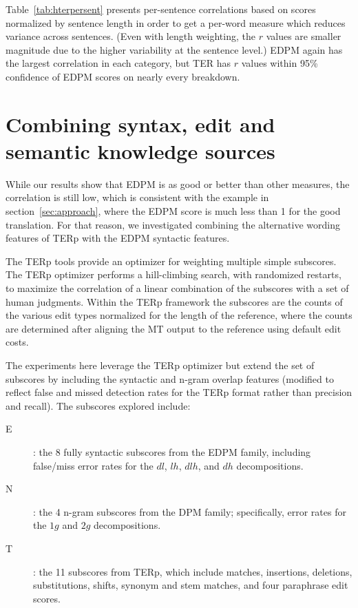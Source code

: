 \documentclass{kluwer}    %
\begin{document}
\begin{article}
Table~\ref{tab:hterpersent} presents per-sentence correlations based on
scores normalized by sentence length in order to get a per-word measure which
reduces variance across sentences.  (Even with length weighting, the
$r$ values are smaller magnitude due to the higher variability at the
sentence level.)  EDPM again has the largest correlation in each
category, but TER has $r$ values within 95\%
confidence of EDPM scores on nearly every breakdown.

\section{Combining syntax, edit and semantic knowledge sources}
\label{sec:hter2}

While our results show that EDPM is as good or better than other
measures, the correlation is still low, which is consistent with
the example in section~\ref{sec:approach}, where the EDPM score is much less than 1 for the good
translation. For that
reason, we investigated combining the alternative wording features of
TERp with the EDPM syntactic features.

The TERp tools \cite{snover09terp} provide an optimizer for
weighting multiple simple subscores.  The TERp optimizer performs a
hill-climbing search, with randomized restarts, to maximize the
correlation of a linear combination of the subscores with a set of
human judgments.  Within the TERp framework the subscores are the
counts of the various edit types normalized for the length of the
reference, where the counts are determined after aligning the MT
output to the reference using default edit costs.

The experiments here leverage the TERp optimizer but extend
the set of subscores by including the syntactic and n-gram overlap
features (modified to reflect false and missed detection rates for the TERp
format rather than precision and recall). The subscores explored include:
\begin{description}
\item[E]: the 8 fully syntactic subscores from the EDPM family, including
  false/miss error rates for the $dl$, $lh$, $dlh$, and $dh$ decompositions. 
\item[N]: the 4 n-gram subscores from the DPM family;
  specifically, error rates for the $1g$ and $2g$ decompositions.
\item[T]: the 11 subscores from TERp, which include matches, insertions, deletions, substitutions, shifts,
  synonym and stem matches, and four paraphrase edit scores.
\end{description}


\end{article}
\end{document}
